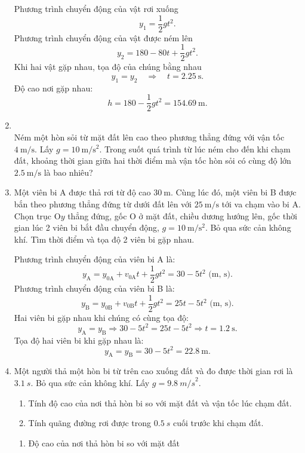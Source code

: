 \begin{enumerate}[label=\bfseries Bài \arabic*:]
{	Phương trình chuyển động của vật rơi xuống
	$$y_1 =\dfrac{1}{2}gt^2.$$
	Phương trình chuyển động của vật được ném lên
	$$y_2 =180 - 80t + \dfrac{1}{2}gt^2.$$
	Khi hai vật gặp nhau, tọa độ của chúng bằng nhau
	$$y_1=y_2 \quad
	\Rightarrow\quad t =\SI{2.25}{\second}.$$
	Độ cao nơi gặp nhau:
	$$h = 180 - \dfrac{1}{2}gt^2 = \SI{154,69}{\meter}.$$		
	
}

\item {}\\
{Ném một hòn sỏi từ mặt đất lên cao theo phương thẳng đứng với vận tốc $\SI{4}{\meter/\second}$. Lấy $g = \SI{10}{\meter/\second^2}$. Trong suốt quá trình từ lúc ném cho đến khi chạm đất, khoảng thời gian giữa hai thời điểm mà vận tốc hòn sỏi có cùng độ lớn $\SI{2.5}{\meter/\second}$ là bao nhiêu?
}
\item {}


{
	Một viên bi A được thả rơi từ độ cao $\SI{30}{\meter}$. Cùng lúc đó, một viên bi B được bắn theo phương thẳng đứng từ dưới đất lên với $\SI{25}{\meter/\second}$ tới va chạm vào bi A. Chọn trục O$y$ thẳng đứng, gốc O ở mặt đất, chiều dương hướng lên, gốc thời gian lúc 2 viên bi bắt đầu chuyển động, $g=\SI{10}{\meter/\second^2}$. Bỏ qua sức cản không khí. Tìm thời điểm và tọa độ 2 viên bi gặp nhau.
}
\hideall
{	
	
	Phương trình chuyển động của viên bi A là:
	$$y_{\text{A}}=y_{0\text{A}}+v_{0\text{A}}t+\dfrac{1}{2}gt^2=30-5t^2 \textrm{ (m, s)}.$$
	Phương trình chuyển động của viên bi B là:
	$$y_{\text{B}}=y_{0\text{B}}+v_{0\text{B}}t+\dfrac{1}{2}gt^2=25t-5t^2\textrm{ (m, s)}.$$
	Hai viên bi gặp nhau khi chúng có cùng tọa độ:
	$$y_{\text{A}}=y_{\text{B}}\Rightarrow 30-5t^2=25t-5t^2 \Rightarrow t=\SI{1.2}{\second}.$$
	Tọa độ hai viên bi khi gặp nhau là:
	$$y_{\text{A}}=y_{\text{B}}=30-5t^2=\SI{22.8}{\meter}.$$
}
\item {}


{
	Một người thả một hòn bi từ trên cao xuống đất và đo được thời gian rơi là $\SI{3,1}{s}$. Bỏ qua sức cản không khí. Lấy $g=\SI{9,8}{m/s}^2$.
	\begin{enumerate}[label=\alph*)]
		\item Tính độ cao của nơi thả hòn bi so với mặt đất và vận tốc lúc chạm đất.
		\item Tính quãng đường rơi được trong $\SI{0,5}{s}$ cuối trước khi chạm đất.
	\end{enumerate}
}
\hideall
{	
	\begin{enumerate}[label=\alph*)]
		\item Độ cao của nơi thả hòn bi so với mặt đất 
		

\end{enumerate}}
\end{enumerate}
